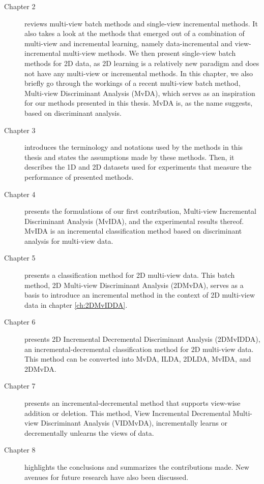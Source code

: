 \begin{description}
	
	\item[Chapter 2] reviews multi-view batch methods and single-view incremental methods. It also takes a look at the methods that emerged out of a combination of multi-view and incremental learning, namely data-incremental and view-incremental multi-view methods. We then present single-view batch methods for 2D data, as 2D learning is a relatively new paradigm and does not have any multi-view or incremental methods. In this chapter, we also briefly go through the workings of a recent multi-view batch method, Multi-view Discriminant Analysis (MvDA), which serves as an inspiration for our methods presented in this thesis. MvDA is, as the name suggests, based on discriminant analysis.
	
	\item[Chapter 3] introduces the terminology and notations used by the methods in this thesis and states the assumptions made by these methods. Then, it describes the 1D and 2D datasets used for experiments that measure the performance of presented methods.
	
	\item[Chapter 4] presents the formulations of our first contribution, Multi-view Incremental Discriminant Analysis (MvIDA), and the experimental results thereof. MvIDA is an incremental classification method based on discriminant analysis for multi-view data.
	
	\item[Chapter 5] presents a classification method for 2D multi-view data. This batch method, 2D Multi-view Discriminant Analysis (2DMvDA), serves as a basis to introduce an incremental method in the context of 2D multi-view data in chapter \ref{ch:2DMvIDDA}.
	
	\item[Chapter 6] presents 2D Incremental Decremental Discriminant Analysis (2DMvIDDA), an incremental-decremental classification method for 2D multi-view data. This method can be converted into MvDA, ILDA, 2DLDA, MvIDA, and 2DMvDA.
	
	\item[Chapter 7] presents an incremental-decremental method that supports view-wise addition or deletion. This method, View Incremental Decremental Multi-view Discriminant Analysis (VIDMvDA), incrementally learns or decrementally unlearns the views of data. 
	
	\item[Chapter 8] highlights the conclusions and summarizes the contributions made. New avenues for future research have also been discussed.
	
\end{description}

\chapterend